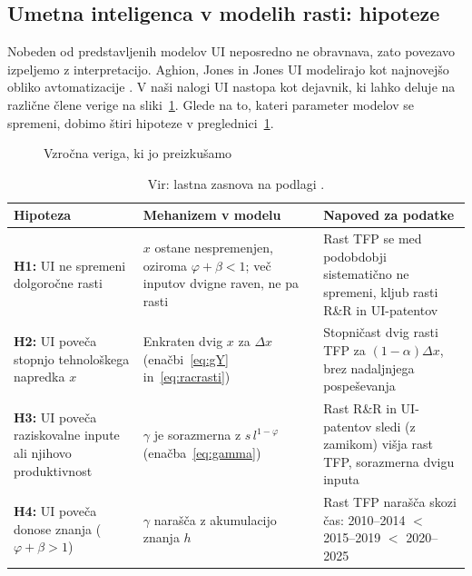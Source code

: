 \documentclass[12pt,a4paper]{article}
\begin{document}
\subsection{Umetna inteligenca v modelih rasti: hipoteze}\label{sec:hipoteze}
Nobeden od predstavljenih modelov UI neposredno ne obravnava, zato povezavo izpeljemo z interpretacijo. Aghion, Jones in Jones UI modelirajo kot najnovejšo obliko avtomatizacije \parencite{aghion2019ai}. V naši nalogi UI nastopa kot dejavnik, ki lahko deluje na različne člene verige na sliki~\ref{fig:veriga}. Glede na to, kateri parameter modelov se spremeni, dobimo štiri hipoteze v preglednici~\ref{tab:hipoteze}.

\begin{figure}[H]
\centering
{}
\caption{Vzročna veriga, ki jo preizkušamo}\label{fig:veriga}
\end{figure}

\begin{table}[H]
\centering
\caption{Hipoteze o vlogi UI in njihove napovedi}\label{tab:hipoteze}
\small
\renewcommand{\arraystretch}{1.2}
\begin{tabularx}{\textwidth}{>{\raggedright\arraybackslash}p{3.1cm} >{\raggedright\arraybackslash}X >{\raggedright\arraybackslash}X}
\toprule
Hipoteza & Mehanizem v modelu & Napoved za podatke \\
\midrule
\textbf{H1:} UI ne spremeni dolgoročne rasti & $x$ ostane nespremenjen, oziroma $\varphi+\beta<1$; več inputov dvigne raven, ne pa rasti & Rast TFP se med podobdobji sistematično ne spremeni, kljub rasti R\&R in UI-patentov \\
\textbf{H2:} UI poveča stopnjo tehnološkega napredka $x$ & Enkraten dvig $x$ za $\Delta x$ (enačbi~\eqref{eq:gY} in~\eqref{eq:racrasti}) & Stopničast dvig rasti TFP za $(1-\alpha)\Delta x$, brez nadaljnjega pospeševanja \\
\textbf{H3:} UI poveča raziskovalne inpute ali njihovo produktivnost & $\gamma$ je sorazmerna z $s\,l^{1-\varphi}$ (enačba~\eqref{eq:gamma}) & Rast R\&R in UI-patentov sledi (z zamikom) višja rast TFP, sorazmerna dvigu inputa \\
\textbf{H4:} UI poveča donose znanja ($\varphi+\beta>1$) & $\gamma$ narašča z akumulacijo znanja $h$ & Rast TFP narašča skozi čas: 2010--2014 $<$ 2015--2019 $<$ 2020--2025 \\
\bottomrule
\end{tabularx}
\caption*{\footnotesize Vir: lastna zasnova na podlagi \parencites{polanec_rast}{garin2021}.}
\end{table}
\end{document}
